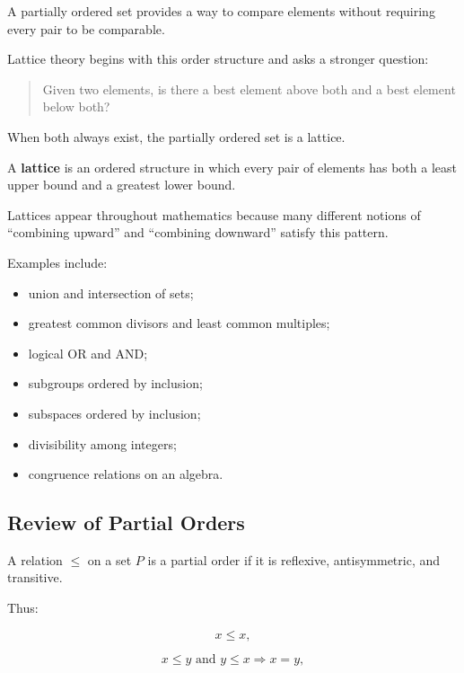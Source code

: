 A partially ordered set provides a way to compare elements without requiring
every pair to be comparable.

Lattice theory begins with this order structure and asks a stronger question:

\begin{quote}
Given two elements, is there a best element above both and a best element
below both?
\end{quote}

When both always exist, the partially ordered set is a lattice.

\begin{conceptbox}
A \textbf{lattice} is an ordered structure in which every pair of elements
has both a least upper bound and a greatest lower bound.
\end{conceptbox}

Lattices appear throughout mathematics because many different notions of
``combining upward'' and ``combining downward'' satisfy this pattern.

Examples include:

\begin{itemize}
    \item union and intersection of sets;
    \item greatest common divisors and least common multiples;
    \item logical OR and AND;
    \item subgroups ordered by inclusion;
    \item subspaces ordered by inclusion;
    \item divisibility among integers;
    \item congruence relations on an algebra.
\end{itemize}

\subsection{Review of Partial Orders}
\label{subsec:lattice-partial-orders}

A relation \(\leq\) on a set \(P\) is a partial order if it is reflexive,
antisymmetric, and transitive.

Thus:

\[ x\leq x, \]

\[ x\leq y\text{ and }y\leq x\Longrightarrow x=y, \]

